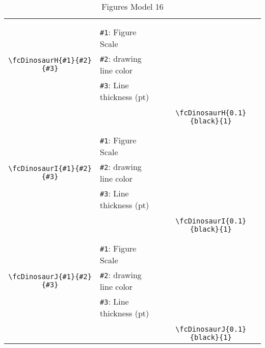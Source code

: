 \documentclass[x11names]{article}
\begin{document}
\begin{table}[H]
\begin{tabular}{|c|l|c|}
	&&\multirow{5}{*}{\fcDinosaurH{0.1}{black}{1}}\\	&&\\	&\verb|#1|: Figure Scale &\\	\verb|\fcDinosaurH{#1}{#2}{#3}|&	\verb|#2|: drawing line color &\\	&\verb|#3|: Line thickness (pt) &\\ &&\\&&	\verb|\fcDinosaurH{0.1}{black}{1}|\\\hline 	
	&&\multirow{5}{*}{\fcDinosaurI{0.1}{black}{1}}\\	&&\\	&\verb|#1|: Figure Scale &\\	\verb|\fcDinosaurI{#1}{#2}{#3}|&	\verb|#2|: drawing line color &\\	&\verb|#3|: Line thickness (pt) &\\ &&\\&&	\verb|\fcDinosaurI{0.1}{black}{1}|\\\hline 	
	&&\multirow{5}{*}{\fcDinosaurJ{0.1}{black}{1}}\\	&&\\	&\verb|#1|: Figure Scale &\\	\verb|\fcDinosaurJ{#1}{#2}{#3}|&	\verb|#2|: drawing line color &\\	&\verb|#3|: Line thickness (pt) &\\ &&\\&&	\verb|\fcDinosaurJ{0.1}{black}{1}|\\\hline 	\hline\end{tabular}\caption{Figures Model 16}\label{tab16}\end{table}
\end{document}

